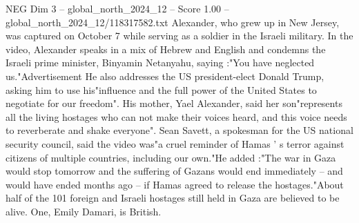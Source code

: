 \begin{textsample}{NEG Dim 3 – global\_north\_2024\_12 – Score 1.00 – global\_north\_2024\_12/118317582.txt}
Alexander, who grew up in New Jersey, was captured on October 7 while serving as a soldier in the Israeli military.
In the video, Alexander speaks in a mix of Hebrew and English and condemns the Israeli prime minister, Binyamin Netanyahu, saying :"You have neglected us."Advertisement He also addresses the US president-elect Donald Trump, asking him to use his"influence and the full power of the United States to negotiate for our freedom".
His mother, Yael Alexander, said her son"represents all the living hostages who can not make their voices heard, and this voice needs to reverberate and shake everyone".
Sean Savett, a spokesman for the US national security council, said the video was"a cruel reminder of Hamas ' s terror against citizens of multiple countries, including our own."He added :"The war in Gaza would stop tomorrow and the suffering of Gazans would end immediately -- and would have ended months ago -- if Hamas agreed to release the hostages."About half of the 101 foreign and Israeli hostages still held in Gaza are believed to be alive.
One, Emily Damari, is British.

\end{textsample}
